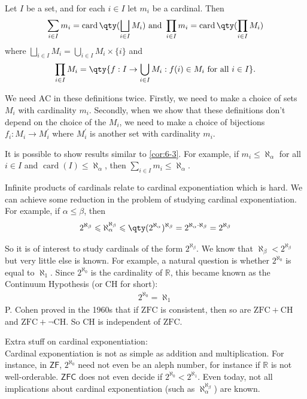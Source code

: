 \begin{definition}
    Let $I$ be a set, and for each $i \in I$ let $m_i$ be a cardinal. Then
    \begin{align*}
        \sum_{i \in I} m_i=\operatorname{card}\qty(\bigsqcup_{i \in I} M_i) \text { and } \prod_{i \in I} m_i=\operatorname{card}\qty(\prod_{i \in I} M_i)
    \end{align*}
    where $\bigsqcup_{i \in I} M_i=\bigcup_{i \in I} M_i \times\{i\}$ and
    \begin{align*}
        \prod_{i \in I} M_i=\qty{f: I \rightarrow \bigcup_{i \in I} M_i: f(i) \in M_i \text { for all } i \in I}.
    \end{align*}
\end{definition}

\begin{note}
    We need AC in these definitions twice. Firstly, we need to make a choice of sets $M_i$ with cardinality $m_i$. Secondly, when we show that these definitions don't depend on the choice of the $M_i$, we need to make a choice of bijections $f_i: M_i \rightarrow M_i^{\prime}$ where $M_i^{\prime}$ is another set with cardinality $m_i$.
\end{note}

\begin{example}
    It is possible to show results similar to \cref{cor:6-3}. For example, if $m_i \leqslant \aleph_\alpha$ for all $i \in I$ and $\operatorname{card}(I) \leqslant \aleph_\alpha$, then $\sum_{i \in I} m_i \leqslant \aleph_\alpha$.
\end{example}

Infinite products of cardinals relate to cardinal exponentiation which is hard. We can achieve some reduction in the problem of studying cardinal exponentiation. For example, if $\alpha \leqslant \beta$, then
\begin{align*}
    2^{\aleph_\beta} \leqslant \aleph_\alpha^{\aleph_\beta} \leqslant\qty(2^{\aleph_\alpha})^{\aleph_\beta}=2^{\aleph_\alpha \cdot \aleph_\beta}=2^{\aleph_\beta}
\end{align*}

So it is of interest to study cardinals of the form $2^{\aleph_\beta}$. We know that $\aleph_\beta<2^{\aleph_\beta}$ but very little else is known. For example, a natural question is whether $2^{\aleph_0}$ is equal to $\aleph_1$. Since $2^{\aleph_0}$ is the cardinality of $\mathbb{R}$, this became known as the Continuum Hypothesis (or $\mathrm{CH}$ for short):
\begin{align*}
    2^{\aleph_0}=\aleph_1
\end{align*}
P. Cohen proved in the 1960s that if $\mathrm{ZFC}$ is consistent, then so are $\mathrm{ZFC}+\mathrm{CH}$ and $\mathrm{ZFC}+\neg \mathrm{CH}$. So $\mathrm{CH}$ is independent of $\mathrm{ZFC}$.

Extra stuff on cardinal exponentiation: \\
Cardinal exponentiation is not as simple as addition and multiplication.
For instance, in $\mathsf{ZF}$, $2^{\aleph_0}$ need not even be an aleph number, for instance if $\mathbb R$ is not well-orderable.
$\mathsf{ZFC}$ does not even decide if $2^{\aleph_0} < 2^{\aleph_1}$.
Even today, not all implications about cardinal exponentiation (such as $\aleph_\alpha^{\aleph_\beta}$) are known.